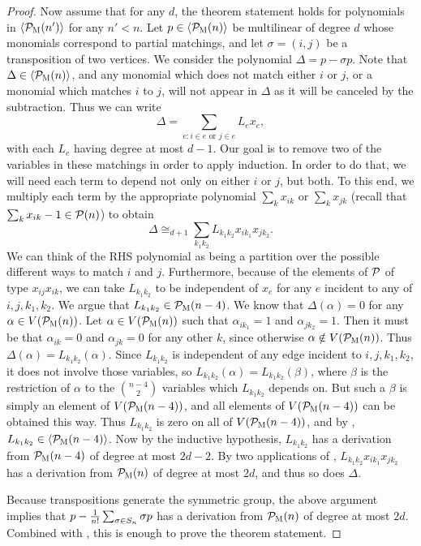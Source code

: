 \begin{proof}
Now assume that for any $d$, the theorem statement holds for polynomials in $\langle \mathcal P_{\textsc{M}}(n') \rangle$ for any $n' < n$. 
Let $p \in \langle \mathcal P_{\textsc{M}}(n) \rangle$ be multilinear of degree $d$ whose monomials correspond to partial matchings, and let $\sigma = (i,j)$ be a transposition of two vertices.
We consider the polynomial $\Delta = p - \sigma p$. Note that $\Delta \in \langle \mathcal P_{\textsc{M}}(n) \rangle$, and any monomial which does not match either $i$ or $j$, or a monomial which matches $i$ to $j$, will not appear in $\Delta$ as it will be canceled by the subtraction.
Thus we can write
\[\Delta = \sum_{e: i \in e \text{ or } j \in e} L_e x_e,\]
with each $L_e$ having degree at most $d-1$. Our goal is to remove two of the variables in these matchings in order to apply induction. In order to do that, we will need each term to depend not only on either $i$ or $j$, but both. To this end, we multiply each term by the appropriate polynomial $\sum_k x_{ik}$ or $\sum_k x_{jk}$ (recall that $\sum_k x_{ik} - 1 \in \mathcal P(n)$) to obtain
\[\Delta \cong_{d+1} \sum_{k_1k_2} L_{k_1k_2} x_{ik_1}x_{jk_2}.\]
We can think of the RHS polynomial as being a partition over the possible different ways to match $i$ and $j$.
Furthermore, because of the elements of $\mathcal P$ of type $x_{ij}x_{ik}$, we can take $L_{k_1k_2}$ to be independent of $x_e$ for any $e$ incident to any of $i,j,k_1,k_2$. 
We argue that $L_{k_1k_2} \in \mathcal P_{\textsc{M}}(n-4)$. We know that $\Delta(\alpha) = 0$ for any $\alpha \in V(\mathcal P_{\textsc{M}}(n))$. Let $\alpha \in V(\mathcal P_{\textsc{M}}(n))$ such that $\alpha_{ik_1} = 1$ and $\alpha_{jk_2} = 1$. 
Then it must be that $\alpha_{ik} = 0$ and $\alpha_{jk} = 0$ for any other $k$, since otherwise $\alpha \notin V(\mathcal P_{\textsc{M}}(n))$.
Thus $\Delta(\alpha) = L_{k_1k_2}(\alpha)$. Since $L_{k_1k_2}$ is independent of any edge incident to $i,j,k_1,k_2$, it does not involve those variables, so $L_{k_1k_2}(\alpha) = L_{k_1k_2}(\beta)$, where $\beta$ is the restriction of $\alpha$ to the $\binom{n-4}{2}$ variables which $L_{k_1k_2}$ depends on. But such a $\beta$ is simply an element of $V(\mathcal P_{\textsc{M}}(n-4))$, and all elements of $V(\mathcal P_{\textsc{M}}(n-4))$ can be obtained this way. Thus $L_{k_1k_2}$ is zero on all of $V(\mathcal P_{\textsc{M}}(n-4))$, and by , $L_{k_1k_2} \in \langle \mathcal P_{\textsc{M}}(n-4) \rangle$. Now by the inductive hypothesis, $L_{k_1k_2}$ has a derivation from $\mathcal P_{\textsc{M}}(n-4)$ of degree at most $2d-2$. By two applications of , $L_{k_1k_2}x_{ik_1}x_{jk_2}$ has a derivation from $\mathcal P_{\textsc{M}}(n)$ of degree at most $2d$, and thus so does $\Delta$.

Because transpositions generate the symmetric group, the above argument implies that $p - \frac{1}{n!}\sum_{\sigma \in S_{n}} \sigma p$ has a derivation from $\mathcal P_{\textsc{M}}(n)$ of degree at most $2d$. Combined with , this is enough to prove the theorem statement. 
\end{proof}

